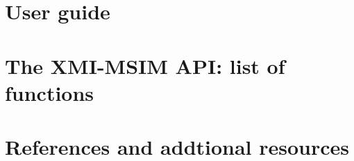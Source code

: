 \documentclass[11pt,a4paper,oneside,titlepage]{article}
\begin{document}
\section{User guide}\label{User-guide}

\section{The XMI-MSIM API: list of functions}\label{The-XMI-MSIM-API-list-of-functions}

\section{References and addtional resources}\label{References-and-additional-resources}

\end{document}
